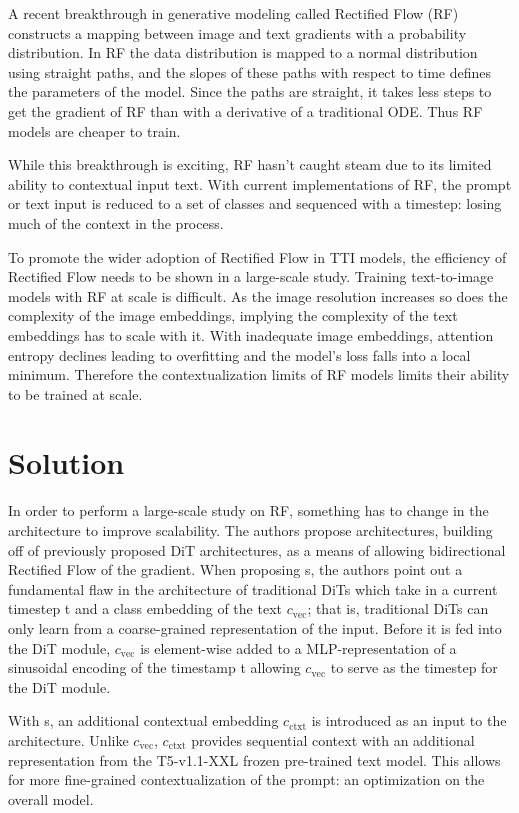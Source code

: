 \documentclass{genai}
\begin{document}
A recent breakthrough in generative modeling called Rectified Flow (RF) constructs a mapping between image and text gradients with a probability distribution. In RF the data distribution is mapped to a normal distribution using straight paths, and the slopes of these paths with respect to time defines the parameters of the model. Since the paths are straight, it takes less steps to get the gradient of RF than with a derivative of a traditional ODE. Thus RF models are cheaper to train.

While this breakthrough is exciting, RF hasn’t caught steam due to its limited ability to contextual input text. With current implementations of RF, the prompt or text input is reduced to a set of classes and sequenced with a timestep: losing much of the context in the process. 

To promote the wider adoption of Rectified Flow in TTI models, the efficiency of Rectified Flow needs to be shown in a large-scale study. Training text-to-image models with RF at scale is difficult. As the image resolution increases so does the complexity of the image embeddings, implying the complexity of the text embeddings has to scale with it. With inadequate image embeddings, attention entropy declines leading to overfitting and the model’s loss falls into a local minimum. Therefore the contextualization limits of RF models limits their ability to be trained at scale.

\section{Solution}

\hspace{\parindent} In order to perform a large-scale study on RF, something has to change in the architecture to improve scalability.
The authors propose \modelname architectures, building off of previously proposed DiT architectures, as a means of allowing bidirectional Rectified Flow of the gradient.
When proposing \modelname s, the authors point out a fundamental flaw in the architecture of traditional DiTs which take in a current timestep t and a class embedding of the text $c_\text{vec}$; that is, traditional DiTs can only learn from a coarse-grained representation of the input.
Before it is fed into the DiT module, $c_\text{vec}$ is element-wise added to a MLP-representation of a sinusoidal encoding of the timestamp t allowing $c_\text{vec}$ to serve as the timestep for the DiT module.


With \modelname s, an additional contextual embedding $c_\text{ctxt}$ is introduced as an input to the architecture. Unlike $c_\text{vec}$, $c_\text{ctxt}$ provides sequential context with an additional representation from the T5-v1.1-XXL frozen pre-trained text model. This allows for more fine-grained contextualization of the prompt: an optimization on the overall model. 
\end{document}
